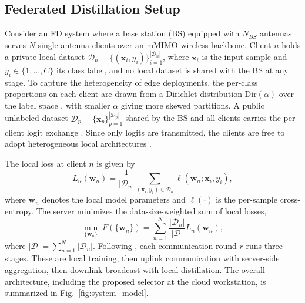 \documentclass[journal]{IEEEtran}
\begin{document}
\subsection{Federated Distillation Setup}
\label{ssec:fd-setup}

Consider an FD system where a base station (BS) equipped with $N_{BS}$ antennas serves $N$ single-antenna clients over an mMIMO wireless backbone. Client $n$ holds a private local dataset $\mathcal{D}_n = \{(\bm{x}_i, y_i)\}_{i=1}^{|\mathcal{D}_n|}$, where $\bm{x}_i$ is the input sample and $y_i \in \{1, \dots, C\}$ its class label, and no local dataset is shared with the BS at any stage. To capture the heterogeneity of edge deployments, the per-class proportions on each client are drawn from a Dirichlet distribution $\text{Dir}(\alpha)$ over the label space \cite{yurochkin2019bayesian}, with smaller $\alpha$ giving more skewed partitions. A public unlabeled dataset $\mathcal{D}_p = \{\bm{x}_p\}_{p=1}^{|\mathcal{D}_p|}$ shared by the BS and all clients carries the per-client logit exchange \cite{itahara2023distillation}. Since only logits are transmitted, the clients are free to adopt heterogeneous local architectures \cite{chan2021fedhe}.

The local loss at client $n$ is given by
\begin{equation}
L_n(\bm{w}_n) = \frac{1}{|\mathcal{D}_n|} \sum_{(\bm{x}_i, y_i) \in \mathcal{D}_n} \ell(\bm{w}_n; \bm{x}_i, y_i),
\label{eq:local_loss}
\end{equation}
where $\bm{w}_n$ denotes the local model parameters and $\ell(\cdot)$ is the per-sample cross-entropy. The server minimizes the data-size-weighted sum of local losses,
\begin{equation}
\min_{\{\bm{w}_n\}} \; F\!\left(\{\bm{w}_n\}\right) = \sum_{n=1}^{N} \frac{|\mathcal{D}_n|}{|\mathcal{D}|} L_n(\bm{w}_n),
\label{eq:global_obj}
\end{equation}
where $|\mathcal{D}| = \sum_{n=1}^{N} |\mathcal{D}_n|$. Following \cite{mu2024fedtskd}, each communication round $r$ runs three stages. These are local training, then uplink communication with server-side aggregation, then downlink broadcast with local distillation. The overall architecture, including the proposed selector at the cloud workstation, is summarized in Fig.~\ref{fig:system_model}.
\end{document}
